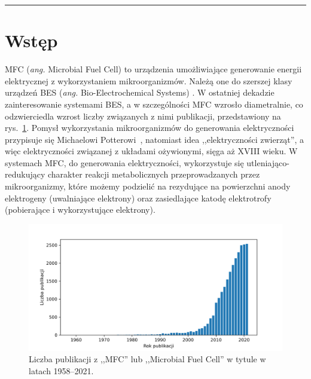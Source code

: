 \documentclass[12pt, a4paper]{article}
\begin{document}


\newpage


\tableofcontents

\begin{abstract}
    \noindent
    \lipsum[1]
\end{abstract}

\rule{\textwidth}{0.4pt}

\begin{otherlanguage}{british}
    \begin{abstract}
        \noindent
        \lipsum[1] 
    \end{abstract}
\end{otherlanguage}

\section{Wstęp}\label{sec:intro}
MFC (\textit{ang.} Microbial Fuel Cell) to urządzenia umożliwiające generowanie energii elektrycznej z wykorzystaniem
mikroorganizmów.
Należą one do szerszej klasy urządzeń BES (\textit{ang.} Bio-Electrochemical Systems) \cite{}.
W ostatniej dekadzie zainteresowanie systemami BES, a w szczególności MFC wzrosło diametralnie, co odzwierciedla wzrost
liczby związanych z nimi publikacji, przedstawiony na rys.~\ref{fig:1}.
Pomysł wykorzystania mikroorganizmów do generowania elektryczności przypisuje się Michaelowi Potterowi~\cite{Potter1911},
natomiast idea ,,elektryczności zwierząt'', a więc elektryczności związanej z układami ożywionymi, sięga aż XVIII wieku.
W systemach MFC, do generowania elektryczności, wykorzystuje się utleniająco-redukujący charakter reakcji metabolicznych
przeprowadzanych przez mikroorganizmy, które możemy podzielić na rezydujące na powierzchni anody elektrogeny
(uwalniające elektrony) oraz zasiedlające katodę elektrotrofy (pobierające i wykorzystujące elektrony).


\begin{figure}[!b]
    \centering
    \includegraphics[width=\textwidth]{figures/pub}
    \caption{Liczba publikacji z ,,MFC'' lub ,,Microbial Fuel Cell'' w tytule w latach 1958--2021.}
    \label{fig:1}
\end{figure}
\end{document}
